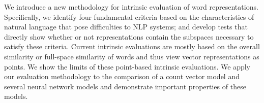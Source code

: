 We introduce a new methodology for intrinsic evaluation of word representations. Specifically, we identify four fundamental criteria based on the characteristics of natural language that pose difficulties to NLP systems; and develop tests that directly show whether or not representations contain the subspaces necessary to satisfy these criteria. Current intrinsic evaluations are mostly based on the overall similarity or full-space similarity of words and thus view vector representations as points. We show the limits of these point-based intrinsic evaluations. We apply our evaluation methodology to the comparison of a count vector model and several neural network models and demonstrate important properties of these models.
